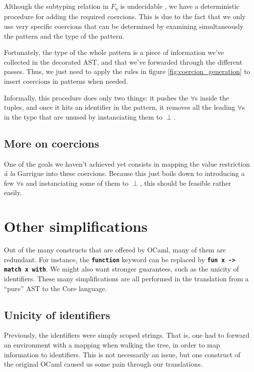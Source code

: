 \documentclass[10pt,a4paper,twoside,titlepage,twocolumn]{article}
\newcommand{\code}[1]{\textbf{\texttt{#1}}}
\begin{document}
Although the subtyping relation in $F_\eta$ is undecidable \cite{mitchell-88},
we have a deterministic procedure for adding the required coercions. This is due
to the fact that we only use very specific coercions that can be determined by
examining simultaneously the pattern and the type of the pattern.

Fortunately, the type of the whole pattern is a piece of information we've
collected in the decorated AST, and that we've forwarded through the different
passes. Thus, we just need to apply the rules in figure
\vref{fig:coercion_generation} to insert coercions in patterns when needed.

Informally, this procedure does only two things: it pushes the $\forall$s inside
the tuples, and once it hits an identifier in the pattern, it removes all the
leading $\forall$s in the type that are unused by instanciating them to $\perp$.

\subsection{More on coercions}

One of the goals we haven't achieved yet consists in mapping the value
restriction \emph{à la} Garrigue into these coercions. Because this just boils
down to introducing a few $\forall$s and instanciating some of them to $\perp$,
this should be feasible rather easily.

\section{Other simplifications\label{desugar}}

Out of the many constructs that are offered by OCaml, many of them are
redundant. For instance, the \code{function} keyword can be replaced by
\code{fun x -> match x with}. We might also want stronger guarantees, such as
the unicity of identifiers. These many simplifications are all performed in the
translation from a ``pure'' AST to the Core language.

\subsection{Unicity of identifiers}

Previously, the identifiers were simply scoped strings. That is, one had to
forward an environment with a mapping when walking the tree, in order to map
information to identifiers. This is not necessarily an issue, but one construct
of the original OCaml caused us some pain through our translations.
\end{document}
